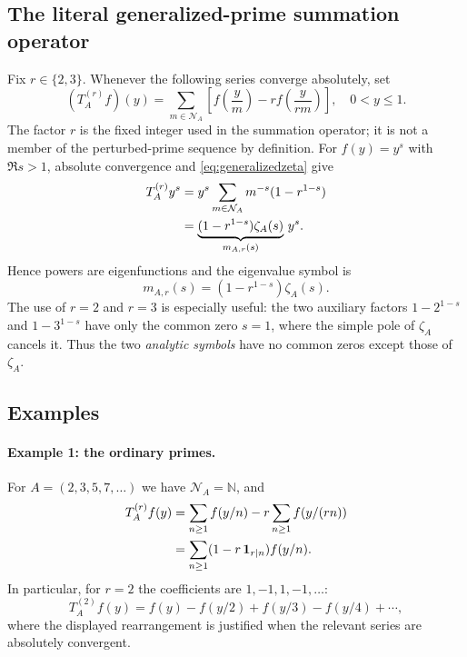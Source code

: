 \documentclass[12pt,letterpaper]{article}
\numberwithin{equation}{section}
\theoremstyle{remark}
\begin{document}
\subsection{The literal generalized-prime summation operator}
Fix $r\in\{2,3\}$.  Whenever the following series converge absolutely,
set
\begin{equation}\label{eq:literalTA}
 \boxed{\displaystyle
 (T_A^{(r)}f)(y)=\sum_{m\in\mathcal N_A}
 \left[f\!\left(\frac{y}{m}\right)
       -r f\!\left(\frac{y}{rm}\right)\right],\quad 0<y\le1.}
\end{equation}
The factor $r$ is the fixed integer used in the summation operator;
it is not a member of the perturbed-prime sequence by definition.
For $f(y)=y^s$ with $\Re s>1$, absolute convergence and
\eqref{eq:generalizedzeta} give
\begin{align}
 T_A^{(r)}y^s
 &=y^s\sum_{m\in\mathcal N_A}m^{-s}(1-r^{1-s})\notag\\
 &=\underbrace{(1-r^{1-s})\zeta_A(s)}_{m_{A,r}(s)}\,y^s.
 \label{eq:TApower}
\end{align}
Hence powers are eigenfunctions and the eigenvalue symbol is
\begin{equation}\label{eq:TAeigen}
 \boxed{m_{A,r}(s)=(1-r^{1-s})\zeta_A(s).}
\end{equation}
The use of $r=2$ and $r=3$ is especially useful: the two
auxiliary factors $1-2^{1-s}$ and $1-3^{1-s}$ have only the
common zero $s=1$, where the simple pole of $\zeta_A$
cancels it.  Thus the two \emph{analytic symbols} have no common
zeros except those of $\zeta_A$.

\subsection{Examples}
\paragraph{Example 1: the ordinary primes.}
For $A=(2,3,5,7,\ldots)$ we have $\mathcal N_A=\mathbb N$, and
\begin{align}
 T_A^{(r)}f(y)
 &=\sum_{n\ge1}f(y/n)-r\sum_{n\ge1}f(y/(rn))\notag\\
 &=\sum_{n\ge1}(1-r\,\mathbf1_{r\mid n})f(y/n).
 \label{eq:ordinarycase}
\end{align}
In particular, for $r=2$ the coefficients are $1,-1,1,-1,\ldots$:
\[
 T_A^{(2)}f(y)=f(y)-f(y/2)+f(y/3)-f(y/4)+\cdots,
\]
where the displayed rearrangement is justified when the relevant
series are absolutely convergent.
\end{document}
